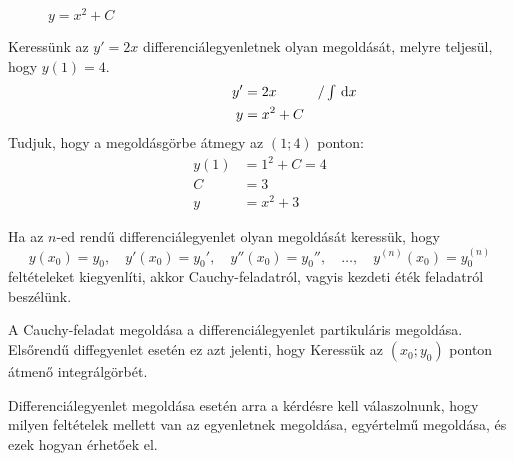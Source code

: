 \documentclass[main.tex]{subfiles}
\begin{document}
\begin{minipage}[c]{.4\textwidth}
  \begin{figure}[H]
    \centering

    \caption{$y = x^2 + C$}
  \end{figure}
\end{minipage}\hfill
\begin{minipage}[c]{.6\textwidth}
  Keressünk az $y' = 2x$ differenciálegyenletnek olyan megoldását,
  melyre teljesül, hogy $y(1) = 4$.
  \begin{align*}
    \hspace{5em} y' & = 2x      &  & {/\textstyle\int \, \mathrm{d} x}
    \\
    y               & = x^2 + C
    \\
  \end{align*}
  Tudjuk, hogy a megoldásgörbe átmegy az $(1; 4)$ ponton:
  \begin{align*}
    y(1) & = 1^2 + C = 4 \\
    C    & = 3           \\
    y    & = x^2 + 3
  \end{align*}
\end{minipage}




Ha az $n$-ed rendű differenciálegyenlet olyan megoldását
keressük, hogy
\begin{equation*}
  y(x_0) = y_0, \quad
  y'(x_0) = y_0', \quad
  y''(x_0) = y_0'', \quad
  \dots, \quad
  y^{(n)}(x_0) = y_0^{(n)}
\end{equation*}
feltételeket kiegyenlíti, akkor Cauchy-feladatról,
vagyis kezdeti éték feladatról beszélünk.




A Cauchy-feladat megoldása a differenciálegyenlet
partikuláris megoldása. Elsőrendű diffegyenlet
esetén ez azt jelenti, hogy Keressük az
$(x_0; y_0)$ ponton átmenő integrálgörbét.

\vspace{.33em}
Differenciálegyenlet megoldása esetén arra a kérdésre
kell válaszolnunk, hogy milyen feltételek mellett
van az egyenletnek megoldása, egyértelmű megoldása,
és ezek hogyan érhetőek el.
\end{document}
